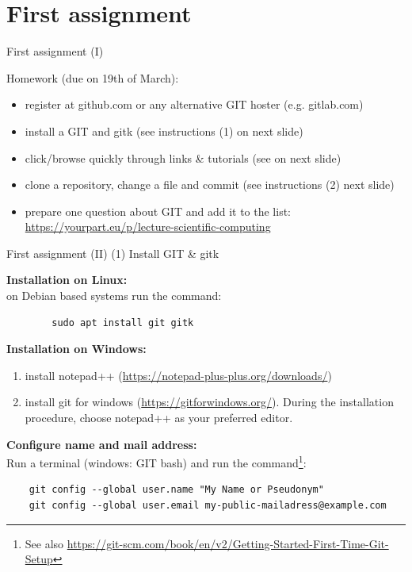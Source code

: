 \documentclass[10pt,color=usenames,dvipsnames]{beamer}
\begin{document}
\section{First assignment}

\begin{frame}{First assignment (I)}

Homework (due on 19th of March):

\begin{itemize}
	\item register at github.com or any alternative GIT hoster (e.g. gitlab.com)
	\item install a GIT and gitk (see instructions (1) on next slide)
	\item click/browse quickly through links \& tutorials (see on next slide)
	\item clone a repository, change a file and commit (see instructions (2) next slide)
	\item prepare one question about GIT and add it to the list: \href{https://yourpart.eu/p/lecture-scientific-computing}{https://yourpart.eu/p/lecture-scientific-computing}

\end{itemize}


\end{frame}

\begin{frame}[fragile]{First assignment (II)}
	(1) Install GIT \& gitk

    {\bf Installation on Linux:}\\
    on Debian based systems run the command:

	\begin{verbatim}
	    sudo apt install git gitk
	\end{verbatim}

    {\bf Installation on Windows:}
    \begin{enumerate}
        \item install notepad++ (\href{https://notepad-plus-plus.org/downloads/}{https://notepad-plus-plus.org/downloads/})
        \item install git for windows
            (\href{https://gitforwindows.org/}{https://gitforwindows.org/}). During the
            installation procedure, choose notepad++ as your preferred editor.
    \end{enumerate}

    {\bf Configure name and mail address:}\\
    Run a terminal (windows: GIT bash) and run the command\footnote{
        See also
            \href{https://git-scm.com/book/en/v2/Getting-Started-First-Time-Git-Setup}
            {https://git-scm.com/book/en/v2/Getting-Started-First-Time-Git-Setup}
    }:
    {\small
        \begin{verbatim}
    git config --global user.name "My Name or Pseudonym"
    git config --global user.email my-public-mailadress@example.com
        \end{verbatim}
    }

\end{frame}
\end{document}
